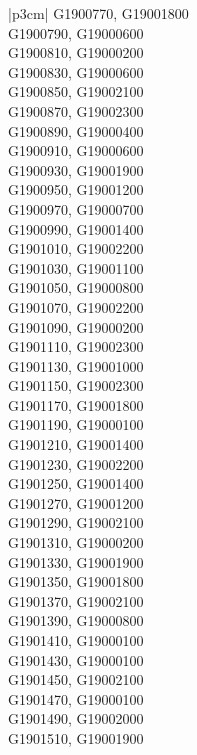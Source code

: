 \begin{customLongTable}{ |p{3cm}| }
G1900770, G19001800 \\ \hline
G1900790, G19000600 \\ \hline
G1900810, G19000200 \\ \hline
G1900830, G19000600 \\ \hline
G1900850, G19002100 \\ \hline
G1900870, G19002300 \\ \hline
G1900890, G19000400 \\ \hline
G1900910, G19000600 \\ \hline
G1900930, G19001900 \\ \hline
G1900950, G19001200 \\ \hline
G1900970, G19000700 \\ \hline
G1900990, G19001400 \\ \hline
G1901010, G19002200 \\ \hline
G1901030, G19001100 \\ \hline
G1901050, G19000800 \\ \hline
G1901070, G19002200 \\ \hline
G1901090, G19000200 \\ \hline
G1901110, G19002300 \\ \hline
G1901130, G19001000 \\ \hline
G1901150, G19002300 \\ \hline
G1901170, G19001800 \\ \hline
G1901190, G19000100 \\ \hline
G1901210, G19001400 \\ \hline
G1901230, G19002200 \\ \hline
G1901250, G19001400 \\ \hline
G1901270, G19001200 \\ \hline
G1901290, G19002100 \\ \hline
G1901310, G19000200 \\ \hline
G1901330, G19001900 \\ \hline
G1901350, G19001800 \\ \hline
G1901370, G19002100 \\ \hline
G1901390, G19000800 \\ \hline
G1901410, G19000100 \\ \hline
G1901430, G19000100 \\ \hline
G1901450, G19002100 \\ \hline
G1901470, G19000100 \\ \hline
G1901490, G19002000 \\ \hline
G1901510, G19001900 \\ \hline

\end{customLongTable}

